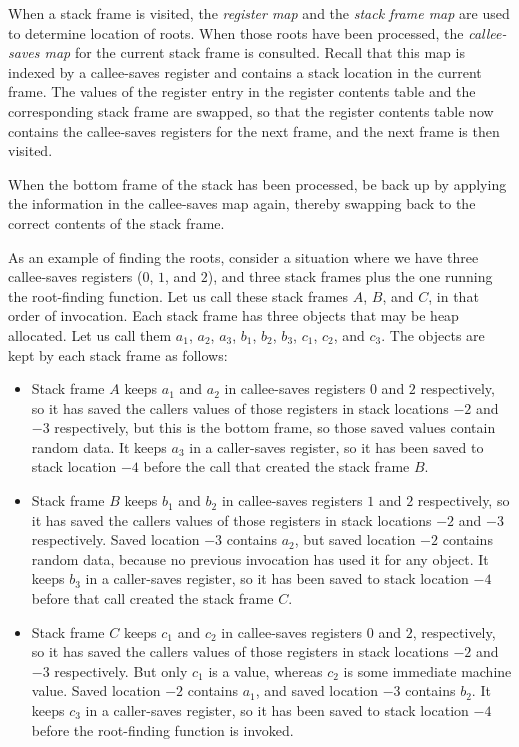 When a stack frame is visited, the \emph{register map} and the
\emph{stack frame map} are used to determine location of roots.  When
those roots have been processed, the \emph{callee-saves map} for the
current stack frame is consulted.  Recall that this map is indexed by
a callee-saves register and contains a stack location in the current
frame.  The values of the register entry in the register contents
table and the corresponding stack frame are swapped, so that the
register contents table now contains the callee-saves registers for
the next frame, and the next frame is then visited.

When the bottom frame of the stack has been processed, be back up by
applying the information in the callee-saves map again, thereby
swapping back to the correct contents of the stack frame.

As an example of finding the roots, consider a situation where we have
three callee-saves registers ($0$, $1$, and $2$), and three stack
frames plus the one running the root-finding function.  Let us call
these stack frames $A$, $B$, and $C$, in that order of invocation.
Each stack frame has three \commonlisp{} objects that may be heap
allocated.  Let us call them $a_1$, $a_2$, $a_3$, $b_1$, $b_2$, $b_3$,
$c_1$, $c_2$, and $c_3$.  The objects are kept by each stack frame as
follows:

\begin{itemize}
\item Stack frame $A$ keeps $a_1$ and $a_2$ in callee-saves registers
  $0$ and $2$ respectively, so it has saved the callers values of
  those registers in stack locations $-2$ and $-3$ respectively, but
  this is the bottom frame, so those saved values contain random data.
  It keeps $a_3$ in a caller-saves register, so it has been saved to
  stack location $-4$ before the call that created the stack frame
  $B$.
\item Stack frame $B$ keeps $b_1$ and $b_2$ in callee-saves registers
  $1$ and $2$ respectively, so it has saved the callers values of
  those registers in stack locations $-2$ and $-3$ respectively.
  Saved location $-3$ contains $a_2$, but saved location $-2$ contains
  random data, because no previous invocation has used it for any
  \commonlisp{} object.  It keeps $b_3$ in a caller-saves register, so
  it has been saved to stack location $-4$ before that call created
  the stack frame $C$.
\item Stack frame $C$ keeps $c_1$ and $c_2$ in callee-saves registers
  $0$ and $2$, respectively, so it has saved the callers values of
  those registers in stack locations $-2$ and $-3$ respectively.  But
  only $c_1$ is a \commonlisp{} value, whereas $c_2$ is some immediate
  machine value.  Saved location $-2$ contains $a_1$, and saved
  location $-3$ contains $b_2$.  It keeps $c_3$ in a caller-saves
  register, so it has been saved to stack location $-4$ before the
  root-finding function is invoked.
\end{itemize}

